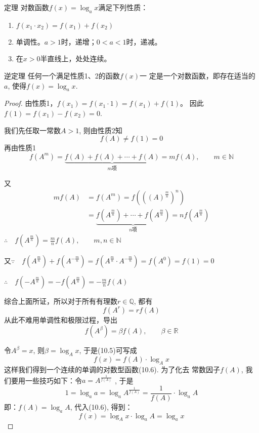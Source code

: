 \begin{blk}{定理}
  对数函数$f(x)=\log_a x$满足下列性质：
  \begin{enumerate}
    \item $f(x_1\cdot x_2)=f(x_1)+f(x_2)$
    \item 单调性。$a>1$时，递增；$0<a<1$时，递减。
    \item 在$x>0$半直线上，处处连续。
  \end{enumerate}
\end{blk}
 
\begin{blk}{逆定理} 
  任何一个满足性质1、2的函数$f(x)$一
定是一个对数函数，即存在适当的$a$, 使得$f(x)=\log_a x$.
\end{blk}

\begin{proof}
  由性质1，$f(x_1)=f(x_1\cdot 1)=f(x_1)+f(1)$。
因此$f(1)=f(x_1)-f(x_2)=0$.

我们先任取一常数$A>1$, 则由性质2知
\[f(A)\ne f(1)=0\]
再由性质1
\[f(A^m)=\underbrace{f(A)+f(A)+\cdots+f(A)}_{\text{$m$项}}=mf(A),\qquad m\in\mathbb{N}\]

又
\[\begin{split}
  mf(A)&=f(A^m)=f\left(\left((A)^{\tfrac{m}{n}}\right)^n\right)\\
  &=\underbrace{f\left(A^{\tfrac{m}{n}}\right)+\cdots+f\left(A^{\tfrac{m}{n}}\right)}_{\text{$n$项}}=nf\left(A^{\tfrac{m}{n}}\right)
\end{split} \]
$\therefore\quad f\left(A^{\tfrac{m}{n}}\right)=\frac{m}{n}f(A),\qquad m,n\in\mathbb{N}$

又$\because\quad f\left(A^{\tfrac{m}{n}}\right)+f\left(A^{-\tfrac{m}{n}}\right)=f\left(A^{\tfrac{m}{n}}\cdot A^{-\tfrac{m}{n}}\right)=f(A^0)=f(1)=0$

$\therefore\quad f\left(-A^{\tfrac{m}{n}}\right)=-f\left(A^{\tfrac{m}{n}}\right)=-\frac{m}{n}f(A)$

综合上面所证，所以对于所有有理数$r\in\mathbb{Q}$, 都有
\[f(A^r)=rf(A)\]
从此不难用单调性和极限过程，导出
\begin{equation}
  f(A^{\beta })=\beta f(A),\qquad \beta \in\mathbb{R}
\end{equation}

令$A^{\beta }=x$, 则$\beta =\log_A x$, 于是(10.5)可写成
\begin{equation}
  f(x)=f(A)\cdot \log_A x
\end{equation}
这样我们得到一个连续的单调的对数型函数(10.6). 为了化去
常数因子$f(A)$, 我们要用一些技巧如下：令$a=A^{\tfrac{1}{f(A)}}$
, 于是
\[1=\log_a a=\log_a A^{\tfrac{1}{f(A)}}=\frac{1}{f(A)}\cdot \log_a A\]
即：$f(A)=\log_a A$, 代入(10.6), 得到：
\[f(x)=\log_A x\cdot \log_a A=\log_a x\]
\end{proof}

